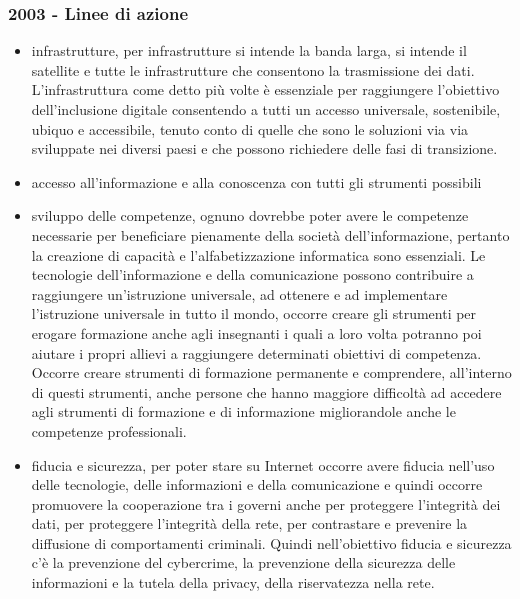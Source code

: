 \subsubsection{2003 - Linee di azione}

\begin{itemize}
    \item  infrastrutture, per infrastrutture si intende la banda larga, si intende il satellite e tutte le infrastrutture che consentono la trasmissione dei dati. L'infrastruttura come detto più volte è essenziale per raggiungere l'obiettivo dell'inclusione digitale consentendo a tutti un accesso universale, sostenibile, ubiquo e accessibile, tenuto conto di quelle che sono le soluzioni via via sviluppate nei diversi paesi e che possono richiedere delle fasi di transizione.
    
    \item accesso all'informazione e alla conoscenza con tutti gli strumenti possibili
    
    \item sviluppo delle competenze, ognuno dovrebbe poter avere le competenze necessarie per beneficiare pienamente della società dell'informazione, pertanto la creazione di capacità e l'alfabetizzazione informatica sono essenziali. Le tecnologie dell'informazione e della comunicazione possono contribuire a raggiungere un'istruzione universale, ad ottenere e ad implementare l'istruzione universale in tutto il mondo, occorre creare gli strumenti per erogare formazione anche agli insegnanti i quali a loro volta potranno poi aiutare i propri allievi a raggiungere determinati obiettivi di competenza. Occorre creare strumenti di formazione permanente e comprendere, all'interno di questi strumenti, anche persone che hanno maggiore difficoltà ad accedere agli strumenti di formazione e di informazione migliorandole anche le competenze professionali.
    
    \item fiducia e sicurezza, per poter stare su Internet occorre avere fiducia nell'uso delle tecnologie, delle informazioni e della comunicazione e quindi occorre promuovere la cooperazione tra i governi anche per proteggere l'integrità dei dati, per proteggere l'integrità della rete, per contrastare e prevenire la diffusione di comportamenti criminali. Quindi nell'obiettivo fiducia e sicurezza c'è la prevenzione del cybercrime, la prevenzione della sicurezza delle informazioni e la tutela della privacy, della riservatezza nella rete.
    

\end{itemize}
